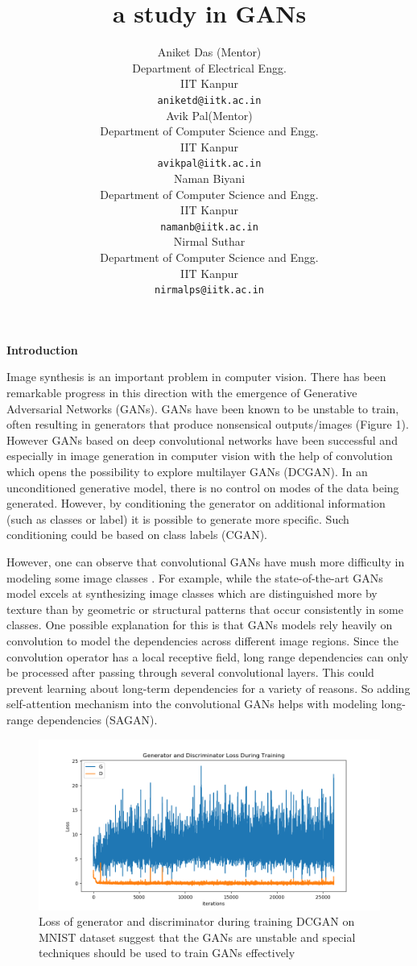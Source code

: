 \documentclass{article}
\title{a study in GANs}
\author{
   Aniket Das (Mentor)\\
   Department of Electrical Engg.\\
   IIT Kanpur\\
   \texttt{aniketd@iitk.ac.in} \\
   \And
    Avik Pal(Mentor)\\
     Department of Computer Science and Engg.\\
     IIT Kanpur\\
     \texttt{avikpal@iitk.ac.in}\\
     \And
     Naman Biyani\\
     Department of Computer Science and Engg.\\
     IIT Kanpur\\
     \texttt{namanb@iitk.ac.in} \\
     \And
     Nirmal Suthar\\
     Department of Computer Science and Engg.\\
     IIT Kanpur\\
     \texttt{nirmalps@iitk.ac.in} \\
     }
\begin{document}
\maketitle
\begin{center}
    {\Large{\textbf{Introduction}}}
\end{center}

Image synthesis is an important problem in computer vision. There has been remarkable progress in this direction with the emergence of Generative Adversarial Networks (GANs). GANs have
been known to be unstable to train, often resulting in generators that produce nonsensical outputs/images (Figure 1). However GANs based on deep convolutional networks have been successful and especially in image generation in computer vision with the help of convolution which opens the possibility to explore multilayer GANs (DCGAN). In an unconditioned generative model, there is no control on modes of the data being generated.
However, by conditioning the generator on additional information (such as classes or label) it is possible to generate more specific. Such conditioning could be based on class labels (CGAN).

However, one can observe that convolutional GANs have mush more difficulty in modeling some image classes . For example, while the state-of-the-art GANs model excels at synthesizing image classes which are distinguished more by texture than by geometric or structural patterns that occur consistently in some classes. One possible explanation for this is that GANs models rely heavily on convolution to model the  dependencies across different image regions. Since the convolution operator has a local receptive field, long range dependencies can only be processed after passing through several convolutional layers. This could prevent learning about long-term dependencies for a variety of reasons. So adding self-attention mechanism into the convolutional GANs helps with modeling long-range dependencies (SAGAN).

\begin{figure}[h]
    \centering
    \includegraphics[width=.8\textwidth]{images/intro_progress.png}
    \caption{Loss of generator and discriminator during training DCGAN on MNIST dataset suggest that the GANs are unstable and special techniques should be used to train GANs effectively}
    \label{fig:mesh1}
\end{figure}
\medskip
\end{document}
